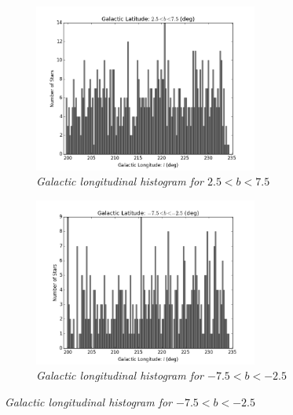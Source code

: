 \documentclass[aps,prb,twocolumn,superscriptaddress]{revtex4-1}
\begin{document}
\begin{figure}
	\centering
	\begin{subfigure}{.5\textwidth}
	  \centering
	  \includegraphics[width=2.9in]{figures/PlotsSpace15/lphist_limit15.png}
		\caption{\it \small{Galactic longitudinal histogram for $2.5 < b < 7.5$}}
		\label{fig:lphist}
	\end{subfigure}%
	\begin{subfigure}{.5\textwidth}
	  \centering
			\includegraphics[width=2.9in]{figures/PlotsSpace15/lnhist_limit15.png}
		\caption{\it \small{Galactic longitudinal histogram for $-7.5 < b < -2.5$ }}
		\label{fig:lnhist}
	\end{subfigure}%
	

\end{figure}
\end{document}
